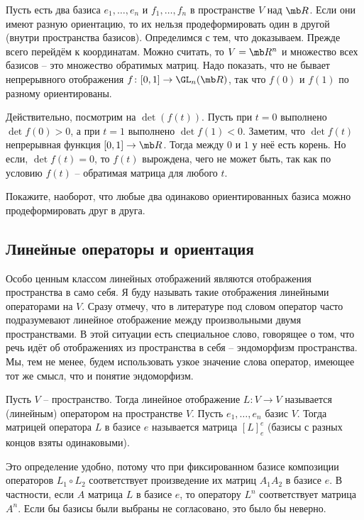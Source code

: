 \utv Пусть есть два базиса $e_1,\dots,e_n$ и $f_1,\dots,f_n$ в пространстве $V$ над $\mb R$. Если они имеют разную ориентацию, то их нельзя продеформировать один в другой (внутри пространства базисов).
\proof Определимся с тем, что доказываем. Прежде всего перейдём к координатам. Можно считать, то $V=\mb R^n$ и множество всех базисов -- это множество обратимых матриц. Надо показать, что не бывает непрерывного отображения $f\colon [0,1] \to \GL_n(\mb R)$, так что $f(0)$ и $f(1)$ по разному ориентированы. 

Действительно, посмотрим на $\det (f(t))$. Пусть при $t=0$ выполнено $\det f(0)>0$,  а при $t=1$ выполнено $\det f(1)<0$. Заметим, что $\det f(t)$ непрерывная функция $[0,1] \to \mb R$. Тогда между $0$ и $1$ у неё есть корень. Но если, $\det f(t)=0$, то $f(t)$ вырождена, чего не может быть, так как по условию $f(t)$ -- обратимая матрица для любого $t$.
\endproof
\eutv

\upr Покажите, наоборот, что любые два одинаково ориентированных базиса можно продеформировать друг в друга.
\eupr

\subsection{Линейные операторы и ориентация}

Особо ценным классом линейных отображений являются отображения пространства в само себя. Я буду называть такие отображения линейными операторами на $V$. Сразу отмечу, что в литературе под словом оператор часто подразумевают линейное отображение между произвольными двумя пространствами. В этой ситуации есть специальное слово, говорящее о том, что речь идёт об отображениях из пространства в себя  -- эндоморфизм пространства. Мы, тем не менее, будем использовать узкое значение слова оператор, имеющее тот же смысл, что и понятие эндоморфизм.

\dfn Пусть $V$ -- пространство. Тогда линейное отображение $L\colon V \to V$ называется (линейным) оператором  на пространстве $V$. Пусть $e_1,\dots, e_n$ базис $V$. Тогда матрицей оператора $L$ в базисе $e$ называется матрица $[L]_e^e$ (базисы с разных концов взяты одинаковыми).
\edfn

Это определение удобно, потому что при фиксированном базисе композиции операторов $L_1\circ L_2$ соответствует произведение их матриц $A_1A_2$ в базисе $e$. В частности, если $A$ матрица $L$ в базисе $e$, то оператору $L^n$ соответствует матрица $A^n$. Если бы базисы были выбраны не согласовано, это было бы неверно. 

